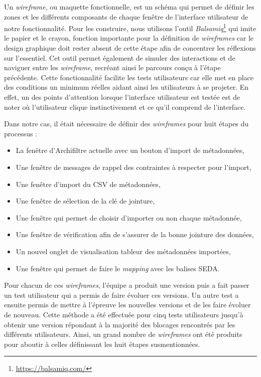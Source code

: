 Un \textit{\gls{wireframe}}, ou maquette fonctionnelle, est un schéma qui permet de définir les zones et les différents composants de chaque fenêtre de l’interface utilisateur de notre fonctionnalité. Pour les construire, nous utilisons l’outil \textit{Balsamiq}\footnote{ \href{https://balsamiq.com/}{https://balsamiq.com/}} qui imite le papier et le crayon, fonction importante pour la définition de \textit{\gls{wireframe}s} car le design graphique doit rester absent de cette étape afin de concentrer les réflexions sur l’essentiel. Cet outil permet également de simuler des interactions et de naviguer entre les \textit{\gls{wireframe}}, recréant ainsi le parcours conçu à l'étape précédente. Cette fonctionnalité facilite les tests utilisateurs car elle met en place des conditions un minimum réelles aidant ainsi les utilisateurs à se projeter. En effet, un des points d’attention lorsque l’interface utilisateur est testée est de noter où l’utilisateur clique instinctivement et ce qu’il comprend de l’interface. 


Dans notre cas, il était nécessaire de définir des \textit{\gls{wireframe}s} pour huit étapes du processus : 
\begin{itemize}
	\item La fenêtre d’\gls{Archifiltre} actuelle avec un bouton d’import de métadonnées, 
	\item Une fenêtre de messages de rappel des contraintes à respecter pour l’import,
	\item Une fenêtre d’import du CSV de métadonnées, 
	\item Une fenêtre de sélection de la clé de jointure,  
	\item Une fenêtre qui permet de choisir d’importer ou non chaque métadonnée, 
	\item Une fenêtre de vérification afin de s’assurer de la bonne jointure des données, 
	\item Un nouvel onglet de visualisation tableur des métadonnées importées,  
	\item Une fenêtre qui permet de faire le \textit{\gls{mapping}} avec les balises \gls{SEDA}. 
\end{itemize}
Pour chacun de ces \textit{\gls{wireframe}s}, l’équipe a produit une version puis a fait passer un test utilisateur qui a permis de faire évoluer ces versions. Un autre test a ensuite permis de mettre à l’épreuve les nouvelles versions et de les faire évoluer de nouveau. Cette méthode a été effectuée pour cinq tests utilisateurs jusqu’à obtenir une version répondant à la majorité des blocages rencontrés par les différents utilisateurs. Ainsi, un grand nombre de \textit{\gls{wireframe}s} ont été produits pour aboutir à celles définissant les huit étapes susmentionnées. 


